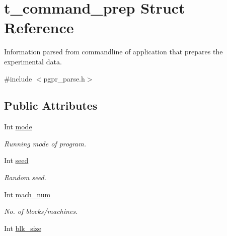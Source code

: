 \hypertarget{structt__command__prep}{\section{t\+\_\+command\+\_\+prep Struct Reference}
\label{structt__command__prep}
}


Information parsed from commandline of application that prepares the experimental data.  




{\ttfamily \#include $<$pgpr\+\_\+parse.\+h$>$}

\subsection*{Public Attributes}
\begin{DoxyCompactItemize}
\item 
\hypertarget{structt__command__prep_a157a7013d31723e9e83ee5edd790a9c2}{Int \hyperlink{structt__command__prep_a157a7013d31723e9e83ee5edd790a9c2}{mode}}\label{structt__command__prep_a157a7013d31723e9e83ee5edd790a9c2}

\begin{DoxyCompactList}\small\item\em Running mode of program. \end{DoxyCompactList}\item 
\hypertarget{structt__command__prep_a5ea7d62fa1431439c77ff1be76a2803b}{Int \hyperlink{structt__command__prep_a5ea7d62fa1431439c77ff1be76a2803b}{seed}}\label{structt__command__prep_a5ea7d62fa1431439c77ff1be76a2803b}

\begin{DoxyCompactList}\small\item\em Random seed. \end{DoxyCompactList}\item 
\hypertarget{structt__command__prep_ae291868f188ef559477de77a0c09b779}{Int \hyperlink{structt__command__prep_ae291868f188ef559477de77a0c09b779}{mach\+\_\+num}}\label{structt__command__prep_ae291868f188ef559477de77a0c09b779}

\begin{DoxyCompactList}\small\item\em No. of blocks/machines. \end{DoxyCompactList}\item 
\hypertarget{structt__command__prep_a854d30f09e6966153b6aad01be20ba75}{Int \hyperlink{structt__command__prep_a854d30f09e6966153b6aad01be20ba75}{blk\+\_\+size}}\label{structt__command__prep_a854d30f09e6966153b6aad01be20ba75}


\end{DoxyCompactItemize}
